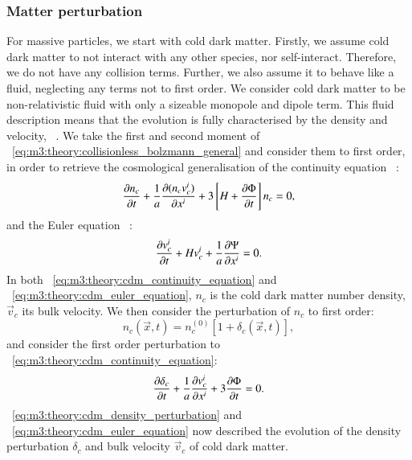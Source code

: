 \subsubsection{Matter perturbation}
    For massive particles, we start with cold dark matter. Firstly, we assume cold dark matter to not interact with any other species, nor self-interact. Therefore, we do not have any collision terms. Further, we also assume it to behave like a fluid, neglecting any terms not to first order. We consider cold dark matter to be non-relativistic fluid with only a sizeable monopole and dipole term. This fluid description means that the evolution is fully characterised by the density and velocity, ~\cite{AST5220LectureNotes}. We take the first and second moment of ~\cref{eq:m3:theory:collisionless_bolzmann_general} and consider them to first order, in order to retrieve the cosmological generalisation of the continuity equation ~\cite[Eq. 5.41]{dodelson2020modern}:
    \begin{equation}\label{eq:m3:theory:cdm_continuity_equation}
        \pdv{n_c}{t}+\frac{1}{a}\pdv{(n_cv_c^i)}{x^i} + 3\left[H+\pdv{\Phi}{t}\right]n_c=0,
    \end{equation}
    and the Euler equation ~\cite[Eq. 5.50]{dodelson2020modern}:
    \begin{equation}\label{eq:m3:theory:cdm_euler_equation}
        \pdv{v_c^i}{t} + Hv_c^i + \frac{1}{a}\pdv{\Psi}{x^i} = 0.
    \end{equation}
    In both ~\cref{eq:m3:theory:cdm_continuity_equation} and ~\cref{eq:m3:theory:cdm_euler_equation}, $n_c$ is the cold dark matter number density, $\vec{v}_c$ its bulk velocity. We then consider the perturbation of $n_c$ to first order:
    \begin{equation}\label{eq:m3:theory:cdm_number_density_perturbation}
        n_c(\vec{x}, t) = n_c^{(0)}[1+\delta_c(\vec{x},t)],
    \end{equation}
    and consider the first order perturbation to ~\cref{eq:m3:theory:cdm_continuity_equation}:
    \begin{equation}\label{eq:m3:theory:cdm_density_perturbation}
        \pdv{\delta_c}{t}+\frac{1}{a}\pdv{v_c^i}{x^i} + 3\pdv{\Phi}{t} = 0.
    \end{equation}
    ~\cref{eq:m3:theory:cdm_density_perturbation} and ~\cref{eq:m3:theory:cdm_euler_equation} now described the evolution of the density perturbation $\delta_c$ and bulk velocity $\vec{v}_c$ of cold dark matter.

